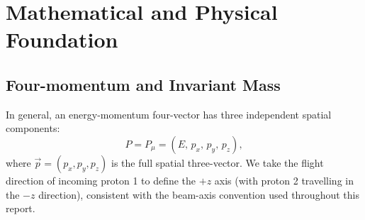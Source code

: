 \documentclass{article}
\begin{document}
\section{Mathematical and Physical Foundation}
\label{sec:kinematics_framework}

\subsection{Four-momentum and Invariant Mass}
In general, an energy-momentum four-vector has three independent spatial components:
\begin{equation}
    P = P_\mu = (E,\, p_x,\, p_y,\, p_z),
\end{equation}
where $\vec{p} = (p_x, p_y, p_z)$ is the full spatial three-vector. We take the flight direction of incoming proton 1 to define the $+z$ axis (with proton 2 travelling in the $-z$ direction), consistent with the beam-axis convention used throughout this report.
\end{document}
